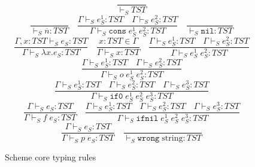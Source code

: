 \begin{figure}[p]
\label{sctr}
\caption{Scheme core typing rules}
\[
\frac{}{\vdash_{S}TST}
\]
\bigskip
\[
\frac{}{\vdash_{S}\overline{n}:TST}
\quad
\frac{\Gamma\vdash_{S}e_{S}^{1}:TST\quad\Gamma\vdash_{S}e_{S}^{2}:TST}{\Gamma\vdash_{S}\mathtt{cons}\;e_{S}^{1}\;e_{S}^{2}:TST}
\quad
\frac{}{\vdash_{S}\mathtt{nil}:TST}
\]
\[
\frac{\Gamma,x:TST\vdash_{S}e_{S}:TST}{\Gamma\vdash_{S}\lambda x.e_{S}:TST}
\quad
\frac{x:TST\in\Gamma}{\Gamma\vdash_{S}x:TST}
\quad
\frac{\Gamma\vdash_{S}e_{S}^{1}:TST\quad\Gamma\vdash_{S}e_{S}^{2}:TST}{\Gamma\vdash_{S}e_{S}^{1}\;e_{S}^{2}:TST}
\]
\[
\frac{\Gamma\vdash_{S}e_{S}^{1}:TST\quad\Gamma\vdash_{S}e_{S}^{2}:TST}{\Gamma\vdash_{S}o\;e_{S}^{1}\;e_{S}^{2}:TST}
\]
\[
\frac{\Gamma\vdash_{S}e_{S}^{1}:TST\quad\Gamma\vdash_{S}e_{S}^{2}:TST\quad\Gamma\vdash_{S}e_{S}^{3}:TST}{\Gamma\vdash_{S}\mathtt{if0}\;e_{S}^{1}\;e_{S}^{2}\;e_{S}^{3}:TST}
\]
\[
\frac{\Gamma\vdash_{S}e_{S}:TST}{\Gamma\vdash_{S}f\;e_{S}:TST}
\quad
\frac{\Gamma\vdash_{S}e_{S}^{1}:TST\quad\Gamma\vdash_{S}e_{S}^{2}:TST\quad\Gamma\vdash_{S}e_{S}^{3}:TST}{\Gamma\vdash_{S}\mathtt{ifnil}\;e_{S}^{1}\;e_{S}^{2}\;e_{S}^{3}:TST}
\]
\[
\frac{\Gamma\vdash_{S}e_{S}:TST}{\Gamma\vdash_{S}p\;e_{S}:TST}
\quad
\frac{}{\vdash_{S}\mathtt{wrong}\;\mathrm{string}:TST}
\]
\end{figure}